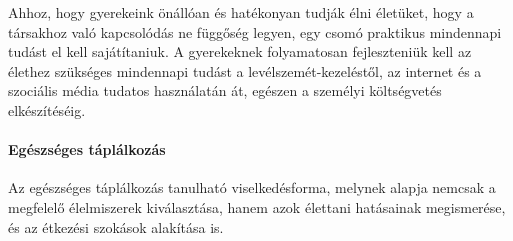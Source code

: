 Ahhoz, hogy gyerekeink önállóan és hatékonyan tudják élni életüket, hogy a társakhoz való kapcsolódás ne függőség legyen, egy csomó praktikus mindennapi tudást el kell sajátítaniuk. A gyerekeknek folyamatosan fejleszteniük kell az élethez szükséges mindennapi tudást a levélszemét-kezeléstől, az internet és a szociális média tudatos használatán át, egészen a személyi költségvetés elkészítéséig.

\paragraph{Egészséges táplálkozás}

Az egészséges táplálkozás tanulható viselkedésforma, melynek alapja nemcsak a megfelelő élelmiszerek kiválasztása, hanem azok élettani hatásainak megismerése, és az étkezési szokások alakítása is.

